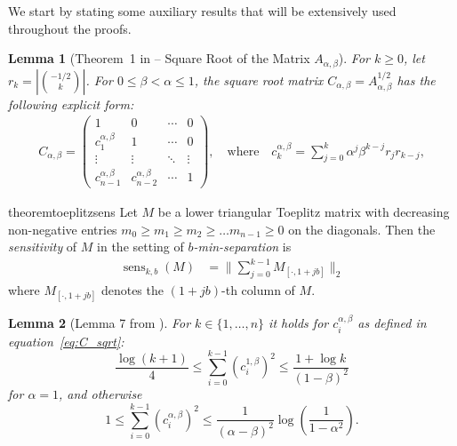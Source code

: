 \documentclass{article} %
\newtheorem{lemma}{Lemma}
\newcommand{\senskb}{\operatorname{sens}_{k, b}}
\begin{document}
We start by stating some auxiliary results that will be extensively used throughout the proofs.

\begin{lemma}[Theorem~1 in \citet{kalinin2024} -- Square Root of the Matrix $A_{\alpha, \beta}$]\label{def:C_sqrt}
For $k\geq 0$, let $r_k = \left|\binom{-1/2}{k}\right|$. For $0 \le \beta < \alpha \le 1$, the square root matrix $C_{\alpha, \beta} = A^{1/2}_{\alpha, \beta}$ has the following explicit form:
%
\begin{align}
    \label{eq:C_sqrt}
    C_{\alpha, \beta} = \begin{pmatrix}
        1 & 0 & \cdots & 0 \\
        c_{1}^{\alpha, \beta} & 1 & \cdots & 0 \\
        \vdots & \vdots & \ddots & \vdots \\
        c_{n - 1}^{\alpha, \beta} & c_{n - 2}^{\alpha, \beta} & \cdots & 1
    \end{pmatrix}, \quad \text{where} \quad c_k^{\alpha, \beta} = \sum\limits_{j = 0}^{k}\alpha^j \beta^{k - j}r_j r_{k - j},
\end{align} 
\end{lemma}

\begin{restatable}{theorem}{toeplitzsens}\label{thm:b-sensitivity}
Let $M$ be a lower triangular Toeplitz matrix with decreasing non-negative entries 
$m_0 \geq m_1 \geq m_2 \geq \dots m_{n-1}\geq 0$ on the diagonals.
%
Then the \emph{sensitivity} of $M$ in the setting of \emph{$b$-min-separation} is
%
\begin{align}
\senskb(M) &= \Big\|\sum_{j = 0}^{k-1}M_{[\cdot, 1 + jb]}\Big\|_2
\label{eq:sens_toeplitz}
\end{align}
where $M_{[\cdot, 1 + jb]}$ denotes the $(1 + jb)$-th column of $M$.
\end{restatable}



\begin{lemma}[Lemma 7 from \citet{kalinin2024}]
\label{lem:sum_c_alpha_beta_squared_bounds}
For $k \in \{1, \dots, n\}$ it holds for $c_i^{\alpha,\beta}$ as defined in equation~\eqref{eq:C_sqrt}:
\begin{equation}
\frac{\log(k + 1)}{4} \leq \sum_{i=0}^{k-1} (c^{1, \beta}_i)^2 \leq \frac{1 + \log k}{(1 - \beta)^2}
\end{equation}
for $\alpha = 1$, and otherwise
\begin{equation}
1 \leq \sum_{i=0}^{k-1} (c^{\alpha, \beta}_i)^2 \leq \frac{1}{(\alpha - \beta)^2} \log \left( \frac{1}{1 - \alpha^2} \right).
\end{equation}
\end{lemma}
\end{document}

